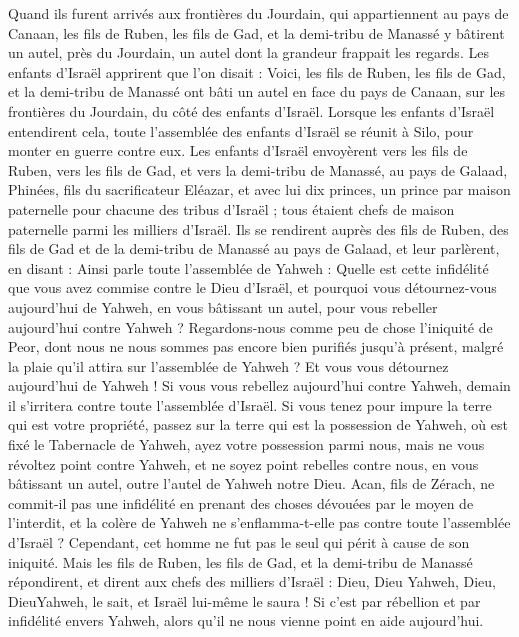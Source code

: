 \begin{multicols}{2}
Quand ils furent arrivés aux frontières du Jourdain, qui appartiennent au pays de Canaan, les fils de Ruben, les fils de Gad, et la demi-tribu de Manassé y bâtirent un autel, près du Jourdain, un autel dont la grandeur frappait les regards.
Les enfants d’Israël apprirent que l’on disait : Voici, les fils de Ruben, les fils de Gad, et la demi-tribu de Manassé ont bâti un autel en face du pays de Canaan, sur les frontières du Jourdain, du côté des enfants d’Israël.
Lorsque les enfants d’Israël entendirent cela, toute l’assemblée des enfants d’Israël se réunit à Silo, pour monter en guerre contre eux.
Les enfants d’Israël envoyèrent vers les fils de Ruben, vers les fils de Gad, et vers la demi-tribu de Manassé, au pays de Galaad, Phinées, fils du sacrificateur Eléazar,
et avec lui dix princes, un prince par maison paternelle pour chacune des tribus d’Israël ; tous étaient chefs de maison paternelle parmi les milliers d’Israël.
Ils se rendirent auprès des fils de Ruben, des fils de Gad et de la demi-tribu de Manassé au pays de Galaad, et leur parlèrent, en disant :
Ainsi parle toute l’assemblée de Yahweh : Quelle est cette infidélité que vous avez commise contre le Dieu d’Israël, et pourquoi vous détournez-vous aujourd’hui de Yahweh, en vous bâtissant un autel, pour vous rebeller aujourd’hui contre Yahweh ?
Regardons-nous comme peu de chose l’iniquité de Peor, dont nous ne nous sommes pas encore bien purifiés jusqu’à présent, malgré la plaie qu’il attira sur l’assemblée de Yahweh ?
Et vous vous détournez aujourd’hui de Yahweh ! Si vous vous rebellez aujourd’hui contre Yahweh, demain il s’irritera contre toute l’assemblée d’Israël.
Si vous tenez pour impure la terre qui est votre propriété, passez sur la terre qui est la possession de Yahweh, où est fixé le Tabernacle de Yahweh, ayez votre possession parmi nous, mais ne vous révoltez point contre Yahweh, et ne soyez point rebelles contre nous, en vous bâtissant un autel, outre l’autel de Yahweh notre Dieu.
Acan, fils de Zérach, ne commit-il pas une infidélité en prenant des choses dévouées par le moyen de l'interdit, et la colère de Yahweh ne s’enflamma-t-elle pas contre toute l’assemblée d’Israël ? Cependant, cet homme ne fut pas le seul qui périt à cause de son iniquité.
Mais les fils de Ruben, les fils de Gad, et la demi-tribu de Manassé répondirent, et dirent aux chefs des milliers d’Israël :
Dieu, Dieu Yahweh, Dieu, DieuYahweh, le sait, et Israël lui-même le saura ! Si c’est par rébellion et par infidélité envers Yahweh, alors qu’il ne nous vienne point en aide aujourd’hui.

\end{multicols}
